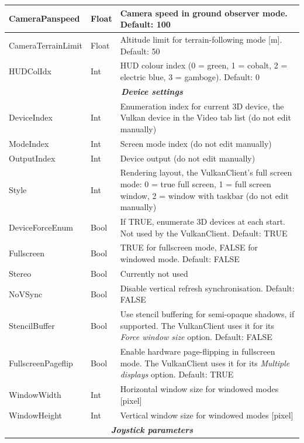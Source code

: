 \documentclass[Orbiter User Manual.tex]{subfiles}
\begin{document}
\begin{longtable}{ |p{}|p{}|p{}| }
	\hline\rule{0pt}{2ex}
	CameraPanspeed & Float & Camera speed in ground observer mode. Default: 100\\
	\hline\rule{0pt}{2ex}
	CameraTerrainLimit & Float & Altitude limit for terrain-following mode [m]. Default: 50\\
	\hline\rule{0pt}{2ex}
	HUDColIdx & Int & HUD colour index (0 = green, 1 = cobalt, 2 = electric blue, 3 = gamboge). Default: 0\\
	\hline
	\multicolumn{3}{|c|}{\rule{0pt}{2ex}\textbf{\textit{Device settings}}}\\
	\hline\rule{0pt}{2ex}
	DeviceIndex & Int & Enumeration index for current 3D device, the Vulkan device in the Video tab list (do not edit manually)\\
	\hline\rule{0pt}{2ex}
	ModeIndex & Int & Screen mode index (do not edit manually)\\
	\hline\rule{0pt}{2ex}
	OutputIndex & Int & Device output (do not edit manually)\\
	\hline\rule{0pt}{2ex}
	Style & Int & Rendering layout, the VulkanClient's full screen mode: 0 = true full screen, 1 = full screen window, 2 = window with taskbar (do not edit manually)\\
	\hline\rule{0pt}{2ex}
	DeviceForceEnum & Bool & If TRUE, enumerate 3D devices at each start. Not used by the VulkanClient. Default: TRUE\\
	\hline\rule{0pt}{2ex}
	Fullscreen & Bool & TRUE for fullscreen mode, FALSE for windowed mode. Default: FALSE\\
	\hline\rule{0pt}{2ex}
	Stereo & Bool & Currently not used\\
	\hline\rule{0pt}{2ex}
	NoVSync & Bool & Disable vertical refresh synchronisation. Default: FALSE\\
	\hline\rule{0pt}{2ex}
	StencilBuffer & Bool & Use stencil buffering for semi-opaque shadows, if supported. The VulkanClient uses it for its \textit{Force window size} option. Default: FALSE\\
	\hline\rule{0pt}{2ex}
	FullscreenPageflip & Bool & Enable hardware page-flipping in fullscreen mode. The VulkanClient uses it for its \textit{Multiple displays} option. Default: TRUE\\
	\hline\rule{0pt}{2ex}
	WindowWidth & Int & Horizontal window size for windowed modes [pixel]\\
	\hline\rule{0pt}{2ex}
	WindowHeight & Int & Vertical window size for windowed modes [pixel]\\
	\hline
	\multicolumn{3}{|c|}{\rule{0pt}{2ex}\textbf{\textit{Joystick parameters}}}\\

\end{longtable}
\end{document}
